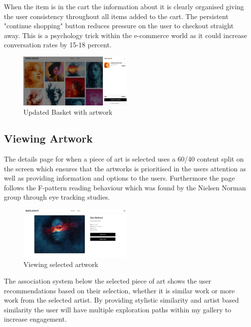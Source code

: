 \documentclass[]{project_final}
\begin{document}
When the item is in the cart the information about it is clearly organised giving the user consistency throughout all items added to the cart.
The persistent "continue shopping" button reduces pressure on the user to checkout straight away. This is a psychology trick within the e-commerce world as it could increase conversation rates by 15-18 percent.

\begin{figure}[ht!]
  \centering
  \includegraphics[width=0.5\textwidth]{AG5.png}
  \vspace*{0.0cm}
  \caption{Updated Basket with artwork}
  \label{fig:1}
\end{figure}

\subsection{Viewing Artwork}

The details page for when a piece of art is selected uses a 60/40 content split on the screen which ensures that the artworks is prioritised in the users attention as well as providing information and options to the users. Furthermore the page follows the F-pattern reading behaviour which was found by the Nielsen Norman group through eye tracking studies.

\begin{figure}[ht!]
  \centering
  \includegraphics[width=0.5\textwidth]{AG6.png}
  \vspace*{0.0cm}
  \caption{Viewing selected artwork}
  \label{fig:1}
\end{figure}

The association system below the selected piece of art shows the user recommendations based on their selection, whether it is similar work or more work from the selected artist. By providing stylistic similarity and artist based similarity the user will have multiple exploration paths within my gallery to increase engagement.
\end{document}
